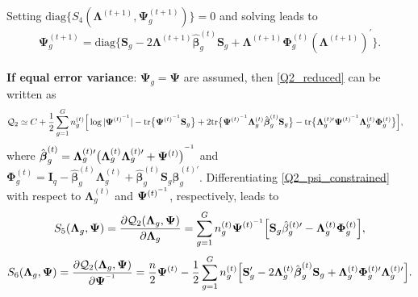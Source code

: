 \documentclass[12pt]{article}
\newcommand{\vecI}{\mathbf{I}}
\newcommand{\inv}{^{\raisebox{.2ex}{$\scriptscriptstyle-1$}}}
\begin{document}
\noindent Setting $\text{diag}\{S_4(\mathbf{\Lambda}^{(t+1)}, \mathbf{\Psi}_g^{(t+1)})\} = 0$ and solving leads to 
\begin{equation*}
\mathbf{\Psi}_g^{(t+1)} = \text{diag}\{\mathbf{S}_g - 2 \mathbf{\Lambda}^{(t+1)}\hat{\boldsymbol{\beta}}_g^{(t)} \mathbf{S}_g + \mathbf{\Lambda}^{(t+1)} \mathbf{\Phi}_g^{(t)} ( \mathbf{\Lambda}^{(t+1)})^{\prime} \}.
\end{equation*}
\\
\noindent \textbf{If equal error variance}: $\mathbf{\Psi}_g = \mathbf{\Psi}$ are assumed, then \eqref{Q2_reduced} can be written as
\begin{equation}
\label{Q2_psi_constrained}
\begin{split}
\mathcal{Q}_2 & \simeq C + \frac{1}{2} \sum_{g=1}^G n_g^{(t)} \Big[ \log |\mathbf{\Psi}^{(t) \inv}| - \text{tr} \big\{\mathbf{\Psi}^{(t) \inv} \mathbf{S}_g\big\} + 2 \text{tr} \big\{\mathbf{\Psi}^{(t) \inv} \mathbf{\Lambda}_g^{(t)} \hat{\boldsymbol{\beta}}_g^{(t)} \mathbf{S}_g \big\} - \text{tr}\big\{\mathbf{\Lambda}_g^{(t) \prime} \mathbf{\Psi}^{(t) \inv} \mathbf{\Lambda}_g^{(t)} \mathbf{\Phi}_g^{(t)} \big\} \Big],
\end{split}
\end{equation} 
where $\hat{\boldsymbol{\beta}}_g^{(t)} = \mathbf{\Lambda}_g^{(t) \prime} \big(\mathbf{\Lambda}_g^{(t)} \mathbf{\Lambda}_g^{(t) \prime} + \mathbf{\Psi}^{(t)} \big)^{\inv}$ and $\mathbf{\Phi}_g^{(t)} = \vecI_q - \hat{\boldsymbol{\beta}}_g^{(t)} \mathbf{\Lambda}_g^{(t)} +  \hat{\boldsymbol{\beta}}_g^{(t)} \mathbf{S}_g \hat{\boldsymbol{\beta}}_g^{(t) \prime}$. Differentiating \eqref{Q2_psi_constrained} with respect to $\mathbf{\Lambda}_g^{(t)}$ and $\mathbf{\Psi}^{(t) \inv}$, respectively, leads to
\begin{equation*}
S_5(\mathbf{\Lambda}_g, \mathbf{\Psi}) = \frac{\partial \mathcal{Q}_2(\mathbf{\Lambda}_g, \mathbf{\Psi})}{\partial \mathbf{\Lambda}_g} = \sum_{g=1}^G n_g^{(t)} \mathbf{\Psi}^{(t) \inv} \Big[ \mathbf{S}_g \hat{\mathbf{\beta}}_g^{(t) \prime} - \mathbf{\Lambda}_g^{(t)} \mathbf{\Phi}_g^{(t)}\Big],
\end{equation*}
\begin{equation*}
S_6(\mathbf{\Lambda}_g, \mathbf{\Psi}) = \frac{\partial \mathcal{Q}_2(\mathbf{\Lambda}_g, \mathbf{\Psi})}{\partial \mathbf{\Psi}^{\inv}} = \frac{n}{2} \mathbf{\Psi}^{(t)} - \frac{1}{2} \sum_{g=1}^G n_g^{(t)} \Big[ \mathbf{S}_g^{\prime} - 2 \mathbf{\Lambda}_g^{(t)} \hat{\boldsymbol{\beta}}_g^{(t)}  \mathbf{S}_g + \mathbf{\Lambda}_g^{(t)} \mathbf{\Phi}_g^{(t) \prime} \mathbf{\Lambda}_g^{(t) \prime} \Big]. 
\end{equation*}
\end{document}
